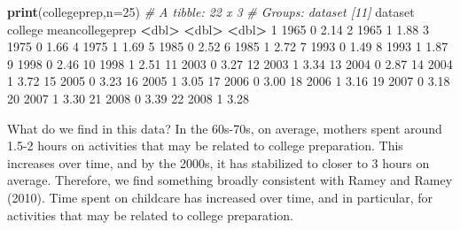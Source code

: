 \documentclass[
]{book}
\newenvironment{Shaded}{\begin{snugshade}}{\end{snugshade}}
\newcommand{\AttributeTok}[1]{\textcolor[rgb]{0.13,0.29,0.53}{#1}}
\newcommand{\CommentTok}[1]{\textcolor[rgb]{0.56,0.35,0.01}{\textit{#1}}}
\newcommand{\DecValTok}[1]{\textcolor[rgb]{0.00,0.00,0.81}{#1}}
\newcommand{\ErrorTok}[1]{\textcolor[rgb]{0.64,0.00,0.00}{\textbf{#1}}}
\newcommand{\FloatTok}[1]{\textcolor[rgb]{0.00,0.00,0.81}{#1}}
\newcommand{\FunctionTok}[1]{\textcolor[rgb]{0.13,0.29,0.53}{\textbf{#1}}}
\newcommand{\NormalTok}[1]{#1}
\newcommand{\SpecialCharTok}[1]{\textcolor[rgb]{0.81,0.36,0.00}{\textbf{#1}}}
\begin{document}
\begin{Shaded}
\begin{Highlighting}[]
\FunctionTok{print}\NormalTok{(collegeprep,}\AttributeTok{n=}\DecValTok{25}\NormalTok{)}
\CommentTok{\# A tibble: 22 x 3}
\CommentTok{\# Groups:   dataset [11]}
\NormalTok{   dataset college meancollegeprep}
     \SpecialCharTok{\textless{}}\NormalTok{dbl}\SpecialCharTok{\textgreater{}}   \ErrorTok{\textless{}}\NormalTok{dbl}\SpecialCharTok{\textgreater{}}           \ErrorTok{\textless{}}\NormalTok{dbl}\SpecialCharTok{\textgreater{}}
 \DecValTok{1}    \DecValTok{1965}       \DecValTok{0}            \FloatTok{2.14}
 \DecValTok{2}    \DecValTok{1965}       \DecValTok{1}            \FloatTok{1.88}
 \DecValTok{3}    \DecValTok{1975}       \DecValTok{0}            \FloatTok{1.66}
 \DecValTok{4}    \DecValTok{1975}       \DecValTok{1}            \FloatTok{1.69}
 \DecValTok{5}    \DecValTok{1985}       \DecValTok{0}            \FloatTok{2.52}
 \DecValTok{6}    \DecValTok{1985}       \DecValTok{1}            \FloatTok{2.72}
 \DecValTok{7}    \DecValTok{1993}       \DecValTok{0}            \FloatTok{1.49}
 \DecValTok{8}    \DecValTok{1993}       \DecValTok{1}            \FloatTok{1.87}
 \DecValTok{9}    \DecValTok{1998}       \DecValTok{0}            \FloatTok{2.46}
\DecValTok{10}    \DecValTok{1998}       \DecValTok{1}            \FloatTok{2.51}
\DecValTok{11}    \DecValTok{2003}       \DecValTok{0}            \FloatTok{3.27}
\DecValTok{12}    \DecValTok{2003}       \DecValTok{1}            \FloatTok{3.34}
\DecValTok{13}    \DecValTok{2004}       \DecValTok{0}            \FloatTok{2.87}
\DecValTok{14}    \DecValTok{2004}       \DecValTok{1}            \FloatTok{3.72}
\DecValTok{15}    \DecValTok{2005}       \DecValTok{0}            \FloatTok{3.23}
\DecValTok{16}    \DecValTok{2005}       \DecValTok{1}            \FloatTok{3.05}
\DecValTok{17}    \DecValTok{2006}       \DecValTok{0}            \FloatTok{3.00}
\DecValTok{18}    \DecValTok{2006}       \DecValTok{1}            \FloatTok{3.16}
\DecValTok{19}    \DecValTok{2007}       \DecValTok{0}            \FloatTok{3.18}
\DecValTok{20}    \DecValTok{2007}       \DecValTok{1}            \FloatTok{3.30}
\DecValTok{21}    \DecValTok{2008}       \DecValTok{0}            \FloatTok{3.39}
\DecValTok{22}    \DecValTok{2008}       \DecValTok{1}            \FloatTok{3.28}
\end{Highlighting}
\end{Shaded}

What do we find in this data? In the 60s-70s, on average, mothers spent around 1.5-2 hours on activities that may be related to college preparation. This increases over time, and by the 2000s, it has stabilized to closer to 3 hours on average. Therefore, we find something broadly consistent with Ramey and Ramey (2010). Time spent on childcare has increased over time, and in particular, for activities that may be related to college preparation.
\end{document}
